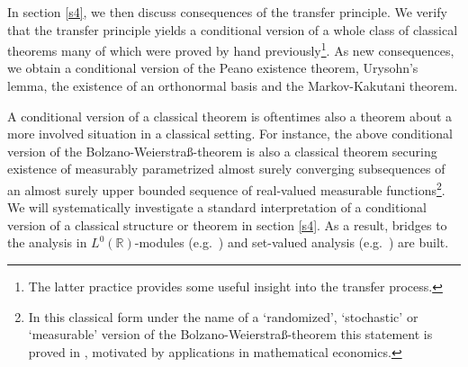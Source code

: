 \documentclass{jloganal}
\numberwithin{equation}{section}
\theoremstyle{plain}
\renewcommand\R{\mathbb{R}}
\begin{document}
In section \ref{s4}, we then discuss consequences of the transfer principle. 
We verify that the transfer principle yields a conditional version of a whole class of classical theorems  many of which were proved by hand previously\footnote{The latter practice  provides  some useful insight into the transfer process.}. 
As new consequences, we obtain a conditional version of the Peano existence theorem, Urysohn's lemma, the existence of an orthonormal basis and the Markov-Kakutani theorem.      


A conditional version of a classical theorem is oftentimes also a theorem about a more involved situation in a classical setting.  
For instance, the above conditional version of the Bolzano-Weierstra{\ss}-theorem is also a classical theorem securing existence of measurably parametrized almost surely converging subsequences of an almost surely upper bounded sequence of real-valued measurable functions\footnote{ 
In this classical form under the name of a `randomized', `stochastic' or `measurable' version of the Bolzano-Weierstra{\ss}-theorem 
this statement is proved in \cite{foellmer2011stochastic,kabanov2001teachers}, motivated by applications in mathematical economics.}.  
We will systematically investigate a standard interpretation of a conditional version of a classical structure or theorem in section \ref{s4}. 
As a result, bridges to the analysis in $L^0(\R)$-modules (e.g.~\cite{cheridito2015conditional,filipovic2009separation}) and set-valued analysis (e.g.~\cite{rockafellar02}) are built. 
\end{document}
